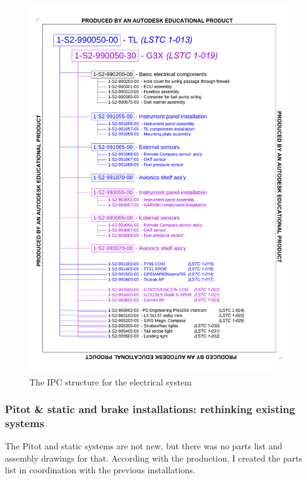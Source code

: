 \documentclass[11pt,a4paper]{article}
\begin{document}
\begin{figure}[ht!]
	\begin{center}
		\includegraphics[width=15cm,trim = 1.9cm 2.4cm 1.9cm 2.4cm, clip]{pics/PIC015.pdf}
		\caption{The IPC structure for the electrical system}
		\label{fig:PIC015}
	\end{center}
\end{figure}

\newpage

\subsubsection{Pitot \& static and brake installations: rethinking existing systems}

The Pitot and static systems are not new, but there was no parts list and assembly drawings for that. According with the production, I created the parts list in coordination with the previous installations.
\end{document}
